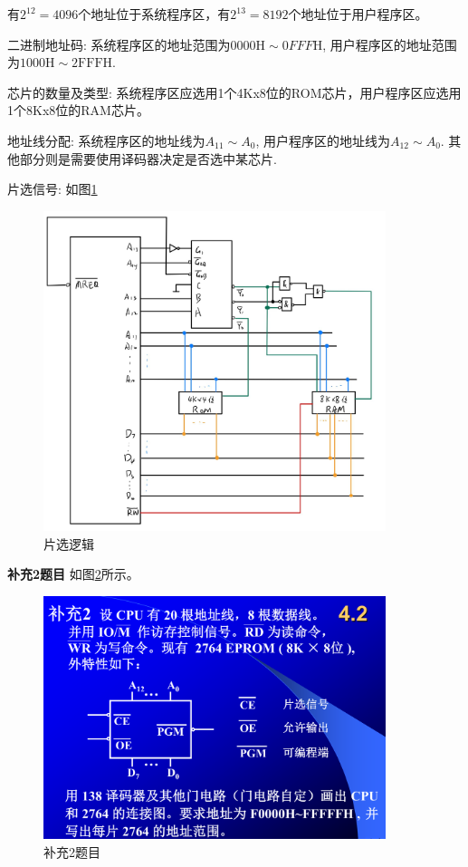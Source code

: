 \documentclass[UTF8]{report}
\newcommand{\mrm}[1]{\mathrm{#1}}
\newcommand{\problem}[1]{{\setlength{\parskip}{10pt}\noindent \bf{#1}}}
\newenvironment{solution}{{\noindent\hskip 2em \bf 解 \quad}}{}
\begin{document}
\begin{solution}
    有$2^{12} = 4096$个地址位于系统程序区，有$2^{13} = 8192$个地址位于用户程序区。
    
    二进制地址码: 系统程序区的地址范围为$0000 \mrm H \sim 0FFF \mrm H$, 用户程序区的地址范围为$1000 \mrm H \sim \mrm{2FFF H}$.

    芯片的数量及类型: 系统程序区应选用1个4Kx8位的ROM芯片，用户程序区应选用1个8Kx8位的RAM芯片。

    地址线分配: 系统程序区的地址线为$A_{11} \sim A_{0}$, 用户程序区的地址线为$A_{12} \sim A_{0}$. 其他部分则是需要使用译码器决定是否选中某芯片.

    片选信号: 如图\ref{fig:4_sup1}

    \begin{figure}[!htbp]
        \centering
        \includegraphics[width=10cm]{fig/4补充1.png}
        \caption{片选逻辑}
        \label{fig:4_sup1}
    \end{figure}
\end{solution}


    \newpage



\problem{补充2题目} 如图\ref{fig:11_sup2}所示。

\begin{figure}[htbp]
    \centering
    \includegraphics[width=10cm]{fig/11.sup2.png}
    \caption{补充2题目}
    \label{fig:11_sup2}
\end{figure}
\end{document}
